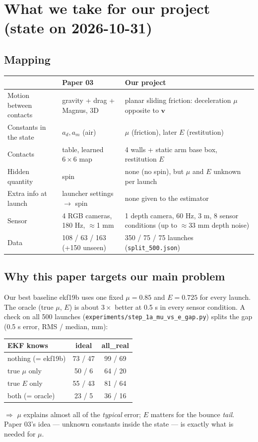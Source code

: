 \documentclass[11pt,a4paper]{article}
\newcommand{\vv}{\mathbf{v}}
\begin{document}
\section{What we take for our project (state on 2026-10-31)}
\subsection{Mapping}
\begin{table}[htbp]
\centering\small\renewcommand{\arraystretch}{1.25}
\begin{tabularx}{\textwidth}{@{}p{3.2cm}XX@{}}
\toprule
 & Paper 03 & Our project \\
\midrule
Motion between contacts & gravity + drag + Magnus, 3D & planar sliding friction: deceleration $\mu$ opposite to $\vv$ \\
Constants in the state & $a_d,a_m$ (air) & $\mu$ (friction), later $E$ (restitution) \\
Contacts & table, learned $6\times6$ map & 4 walls + static arm base box, restitution $E$ \\
Hidden quantity & spin & none (no spin), but $\mu$ and $E$ unknown per launch \\
Extra info at launch & launcher settings $\to$ spin & none given to the estimator \\
Sensor & 4 RGB cameras, 180 Hz, $\approx$1 mm & 1 depth camera, 60 Hz, 3 m, 8 sensor conditions (up to $\approx$33 mm depth noise) \\
Data & 108 / 63 / 163 (+150 unseen) & 350 / 75 / 75 launches (\texttt{split\_500.json}) \\
\bottomrule
\end{tabularx}
\end{table}

\subsection{Why this paper targets our main problem}
Our best baseline ekf19b uses one fixed $\mu=0.85$ and $E=0.725$ for every launch. The oracle (true $\mu$, $E$) is about $3\times$ better at 0.5 s in every sensor condition.
A check on all 500 launches (\texttt{experiments/step\_1a\_mu\_vs\_e\_gap.py}) splits the gap (0.5 s error, RMS / median, mm):
\begin{center}\small
\begin{tabular}{lcc}
\toprule
EKF knows & ideal & all\_real\\
\midrule
nothing (= ekf19b) & 73 / 47 & 99 / 69\\
true $\mu$ only & 50 / 6 & 64 / 20\\
true $E$ only & 55 / 43 & 81 / 64\\
both (= oracle) & 23 / 5 & 36 / 16\\
\bottomrule
\end{tabular}
\end{center}
$\Rightarrow$ $\mu$ explains almost all of the \emph{typical} error; $E$ matters for the bounce \emph{tail}. Paper 03's idea --- unknown constants inside the state --- is exactly what is needed for $\mu$.
\end{document}
